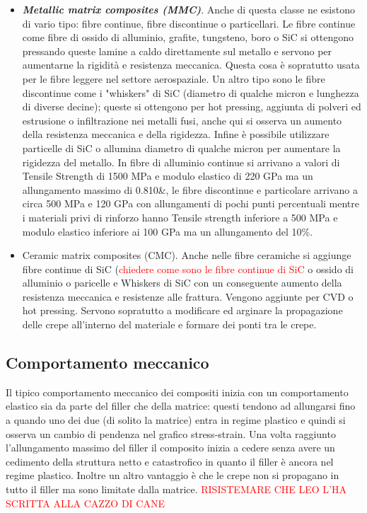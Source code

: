 \documentclass{article}
\begin{document}
\begin{itemize}
\item \textbf{\textit{Metallic matrix composites (MMC)}}. Anche di questa classe ne esistono di vario tipo: fibre continue, fibre discontinue o particellari. Le fibre continue come fibre di ossido di alluminio, grafite, tungsteno, boro o SiC si ottengono pressando queste lamine a caldo direttamente sul metallo e servono per aumentarne la rigidità e resistenza meccanica. Questa cosa è sopratutto usata per le fibre leggere nel settore aerospaziale. Un altro tipo sono le fibre discontinue come i "whiskers" di SiC (diametro di qualche micron e lunghezza di diverse decine); queste si ottengono per hot pressing, aggiunta di polveri ed estrusione o infiltrazione nei metalli fusi, anche qui si osserva un aumento della resistenza meccanica e della rigidezza. Infine è possibile utilizzare particelle di SiC o allumina diametro di qualche micron per aumentare la rigidezza del metallo. In fibre di alluminio continue si arrivano a valori di Tensile Strength di 1500 MPa e modulo elastico di 220 GPa ma un allungamento massimo di 0.810\&, le fibre discontinue e particolare arrivano a circa 500 MPa e 120 GPa con allungamenti di pochi punti percentuali mentre i materiali privi di rinforzo hanno Tensile strength inferiore a 500 MPa e modulo elastico inferiore ai 100 GPa ma un allungamento del 10\%.

\item Ceramic matrix composites (CMC). Anche nelle fibre ceramiche si aggiunge fibre continue di SiC (\textcolor{red}{chiedere come sono le fibre continue di SiC} o ossido di alluminio o paricelle e Whiskers di SiC con un conseguente aumento della resistenza meccanica e resistenze alle frattura. Vengono aggiunte per CVD o hot pressing. Servono sopratutto a modificare ed arginare la propagazione delle crepe all'interno del materiale e formare dei ponti tra le crepe.
\end{itemize}

\subsection{Comportamento meccanico}

Il tipico comportamento meccanico dei compositi inizia con un comportamento elastico sia da parte del filler che della matrice: questi tendono ad allungarsi fino a quando uno dei due (di solito la matrice) entra in regime plastico e quindi si osserva un cambio di pendenza nel grafico stress-strain. Una volta raggiunto l'allungamento massimo del filler il composito inizia a cedere senza avere un cedimento della struttura netto e catastrofico in quanto il filler è ancora nel regime plastico. Inoltre un altro vantaggio è che le crepe non si propagano in tutto il filler ma sono limitate dalla matrice. \textcolor{red}{RISISTEMARE CHE LEO L'HA SCRITTA ALLA CAZZO DI CANE}
\end{document}
